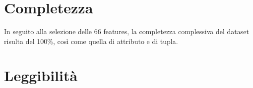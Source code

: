 \section{Completezza}
In seguito alla selezione delle 66 features, la completezza complessiva del 
dataset risulta del 100\%, così come quella di attributo e di tupla.

\section{Leggibilità}
